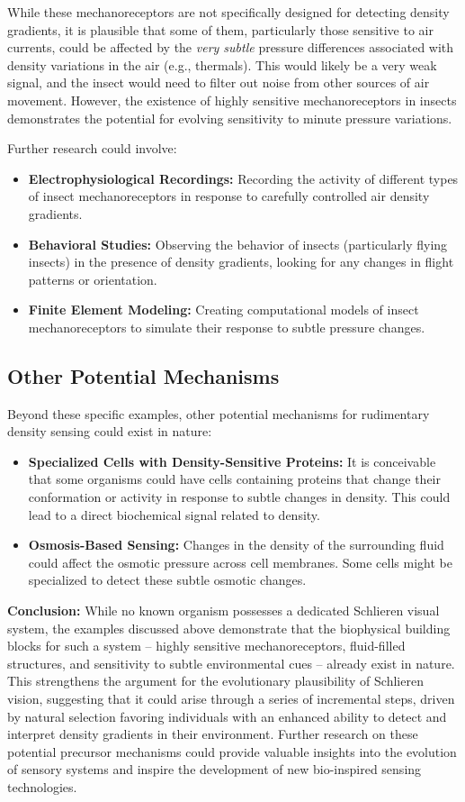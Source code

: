 \documentclass[11pt]{article}
\begin{document}
While these mechanoreceptors are not specifically designed for detecting density gradients, it is plausible that some of them, particularly those sensitive to air currents, could be affected by the \textit{very subtle} pressure differences associated with density variations in the air (e.g., thermals). This would likely be a very weak signal, and the insect would need to filter out noise from other sources of air movement. However, the existence of highly sensitive mechanoreceptors in insects demonstrates the potential for evolving sensitivity to minute pressure variations.

Further research could involve:
\begin{itemize}
    \item \textbf{Electrophysiological Recordings:} Recording the activity of different types of insect mechanoreceptors in response to carefully controlled air density gradients.
    \item \textbf{Behavioral Studies:} Observing the behavior of insects (particularly flying insects) in the presence of density gradients, looking for any changes in flight patterns or orientation.
    \item \textbf{Finite Element Modeling:} Creating computational models of insect mechanoreceptors to simulate their response to subtle pressure changes.
\end{itemize}

\subsection{Other Potential Mechanisms}

Beyond these specific examples, other potential mechanisms for rudimentary density sensing could exist in nature:
\begin{itemize}
    \item \textbf{Specialized Cells with Density-Sensitive Proteins:} It is conceivable that some organisms could have cells containing proteins that change their conformation or activity in response to subtle changes in density. This could lead to a direct biochemical signal related to density.
    \item \textbf{Osmosis-Based Sensing:} Changes in the density of the surrounding fluid could affect the osmotic pressure across cell membranes. Some cells might be specialized to detect these subtle osmotic changes.
\end{itemize}

\noindent\textbf{Conclusion:}
While no known organism possesses a dedicated Schlieren visual system, the examples discussed above demonstrate that the biophysical building blocks for such a system – highly sensitive mechanoreceptors, fluid-filled structures, and sensitivity to subtle environmental cues – already exist in nature. This strengthens the argument for the evolutionary plausibility of Schlieren vision, suggesting that it could arise through a series of incremental steps, driven by natural selection favoring individuals with an enhanced ability to detect and interpret density gradients in their environment. Further research on these potential precursor mechanisms could provide valuable insights into the evolution of sensory systems and inspire the development of new bio-inspired sensing technologies.
\end{document}
